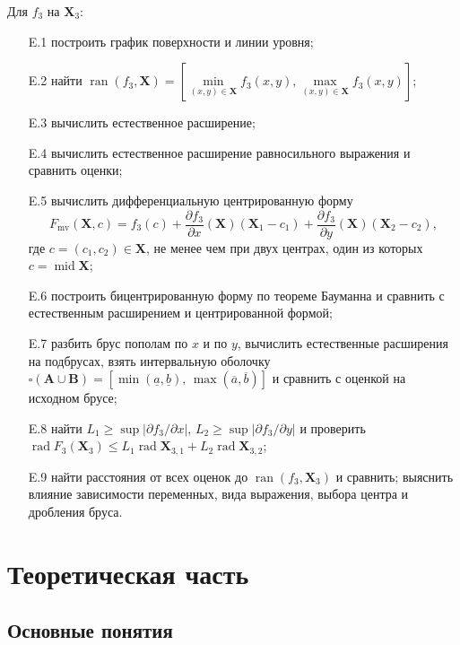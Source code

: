 \documentclass[a4paper, 14pt]{extarticle}
\begin{document}
Для $f_3$ на $\mathbf{X}_3$:
\begin{enumerate}
    \item[E.1] построить график поверхности и линии уровня;
    \item[E.2] найти $\operatorname{ran}(f_3, \mathbf{X}) = \left[ \min\limits_{(x,y)\in \mathbf{X}} f_3(x,y), \max\limits_{(x,y)\in \mathbf{X}} f_3(x,y) \right]$;
    \item[E.3] вычислить естественное расширение;
    \item[E.4] вычислить естественное расширение равносильного выражения и сравнить оценки;
    \item[E.5] вычислить дифференциальную центрированную форму $$F_{\mathrm{mv}}(\mathbf{X}, c) = f_3(c) + \frac{\partial f_3}{\partial x}(\mathbf{X})(\mathbf{X}_1 - c_1) + \frac{\partial f_3}{\partial y}(\mathbf{X})(\mathbf{X}_2 - c_2),$$ где $c = (c_1, c_2) \in \mathbf{X}$, не менее чем при двух центрах, один из которых $c = \operatorname{mid}\mathbf{X}$;
    \item[E.6] построить бицентрированную форму по теореме Бауманна и сравнить с естественным расширением и центрированной формой;
    \item[E.7] разбить брус пополам по $x$ и по $y$, вычислить естественные расширения на подбрусах, взять интервальную оболочку $\square(\mathbf{A} \cup \mathbf{B}) = [\min(\underline{a}, \underline{b}),\, \max(\overline{a}, \overline{b})]$ и сравнить с оценкой на исходном брусе;
    \item[E.8] найти $L_1 \ge \sup\left|\partial f_3/\partial x\right|$, $L_2 \ge \sup\left|\partial f_3/\partial y\right|$ и проверить $\operatorname{rad}F_3(\mathbf{X}_3) \le L_1\operatorname{rad}\mathbf{X}_{3,1} + L_2\operatorname{rad}\mathbf{X}_{3,2}$;
    \item[E.9] найти расстояния от всех оценок до $\operatorname{ran}(f_3, \mathbf{X}_3)$ и сравнить; выяснить влияние зависимости переменных, вида выражения, выбора центра и дробления бруса.
\end{enumerate}

\section{Теоретическая часть}

\subsection{Основные понятия}
\end{document}
